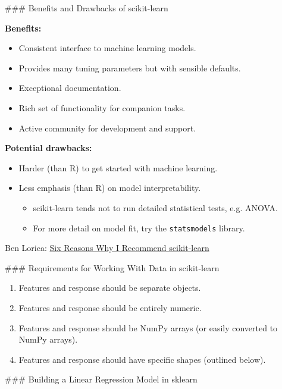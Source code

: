 \documentclass[11pt]{article}
\providecommand{\tightlist}{%
      \setlength{\itemsep}{0pt}\setlength{\parskip}{0pt}}
\begin{document}
     \#\#\# Benefits and Drawbacks of scikit-learn

\textbf{Benefits:}

\begin{itemize}
\tightlist
\item
  Consistent interface to machine learning models.
\item
  Provides many tuning parameters but with sensible defaults.
\item
  Exceptional documentation.
\item
  Rich set of functionality for companion tasks.
\item
  Active community for development and support.
\end{itemize}

\textbf{Potential drawbacks:}

\begin{itemize}
\tightlist
\item
  Harder (than R) to get started with machine learning.
\item
  Less emphasis (than R) on model interpretability.

  \begin{itemize}
  \tightlist
  \item
    scikit-learn tends not to run detailed statistical tests, e.g.
    ANOVA.
  \item
    For more detail on model fit, try the \texttt{statsmodels} library.
  \end{itemize}
\end{itemize}

Ben Lorica:
\href{http://radar.oreilly.com/2013/12/six-reasons-why-i-recommend-scikit-learn.html}{Six
Reasons Why I Recommend scikit-learn}

     \#\#\# Requirements for Working With Data in scikit-learn

\begin{enumerate}
\def\labelenumi{\arabic{enumi}.}
\tightlist
\item
  Features and response should be separate objects.
\item
  Features and response should be entirely numeric.
\item
  Features and response should be NumPy arrays (or easily converted to
  NumPy arrays).
\item
  Features and response should have specific shapes (outlined below).
\end{enumerate}

     \#\#\# Building a Linear Regression Model in sklearn
\end{document}
